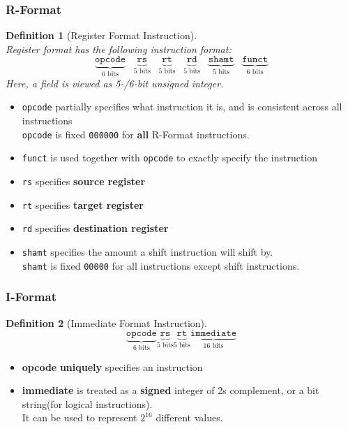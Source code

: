 \documentclass[12pt]{article}
\newtheorem{definition}{Definition}[section]
\theoremstyle{definition}
\begin{document}
\subsubsection{R-Format}
\begin{definition}[Register Format Instruction]\hfill\\\normalfont
Register format has the following instruction format:
\[
\underbrace{\texttt{opcode}}_{\text{6 bits}}\;\;\;\underbrace{\texttt{rs}}_{\text{5 bits}}\;\;\;\underbrace{\texttt{rt}}_{\text{5 bits}}\;\;\;\underbrace{\texttt{rd}}_{\text{5 bits}}\;\;\;\underbrace{\texttt{shamt}}_{\text{5 bits}}\;\;\;\underbrace{\texttt{funct}}_{\text{6 bits}}
\]
Here, a field is viewed as 5-/6-bit unsigned integer.
\end{definition}
\begin{itemize}
  \item \texttt{opcode} partially specifies what instruction it is, and is consistent across all instructions\\\texttt{opcode} is fixed \texttt{000000} for \textbf{all} R-Format instructions.
  \item \texttt{funct} is used together with \texttt{opcode} to exactly specify the instruction
  \item \texttt{rs} specifies \textbf{source register}
  \item \texttt{rt} specifies \textbf{target register}
  \item \texttt{rd} specifies \textbf{destination register}
  \item \texttt{shamt} specifies the amount a shift instruction will shift by.\\
  \texttt{shamt} is fixed \texttt{00000} for all instructions except shift instructions.
\end{itemize}
\subsubsection{I-Format}
\begin{definition}[Immediate Format Instruction]\hfill\\\normalfont
\[
\underbrace{\texttt{opcode}}_{\text{6 bits}}\underbrace{\texttt{rs}}_{\text{5 bits}}\underbrace{\texttt{rt}}_{\text{5 bits}}\underbrace{\texttt{immediate}}_{\text{16 bits}}
\]
\end{definition}
\begin{itemize}
  \item \textbf{opcode} \textbf{uniquely} specifies an instruction
  \item \textbf{immediate} is treated as a \textbf{signed} integer of 2s complement, or a bit string(for logical instructions).\\It can be used to represent $2^{16}$ different values.
\end{itemize}
\end{document}
